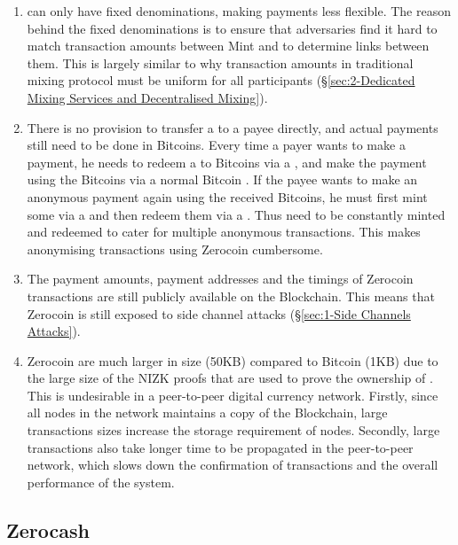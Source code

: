 \begin{enumerate}
	\item {} can only have fixed denominations, making payments less flexible. The reason behind the fixed denominations is to ensure that adversaries find it hard to match transaction amounts between Mint and  to determine links between them. This is largely similar to why transaction amounts in traditional mixing protocol must be uniform for all participants (\S\ref{sec:2-Dedicated Mixing Services and Decentralised Mixing}). 
	\item There is no provision to transfer a \kwCoin{} to a payee directly, and actual payments still need to be done in Bitcoins. Every time a payer wants to make a payment, he needs to redeem a \kwCoin{} to Bitcoins via a , and make the payment using the Bitcoins via a normal Bitcoin \kwTransaction{}{}. If the payee wants to make an anonymous payment again using the received Bitcoins, he must first mint some  via a  and then redeem them via a . Thus  need to be constantly minted and redeemed to cater for multiple anonymous transactions. This makes anonymising transactions using Zerocoin cumbersome. 
	\item The payment amounts, payment addresses and the timings of Zerocoin transactions are still publicly available on the Blockchain. This means that Zerocoin is still exposed to side channel attacks (\S\ref{sec:1-Side Channels Attacks}).
	\item Zerocoin  are much larger in size (50KB) compared to Bitcoin  (1KB) due to the large size of the NIZK proofs that are used to prove the ownership of . This is undesirable in a peer-to-peer digital currency network. Firstly, since all nodes in the network maintains a copy of the Blockchain, large transactions sizes increase the storage requirement of nodes. Secondly, large transactions also take longer time to be propagated in the peer-to-peer network, which slows down the confirmation of transactions and the overall performance of the system.
\end{enumerate}

\subsection{Zerocash}
